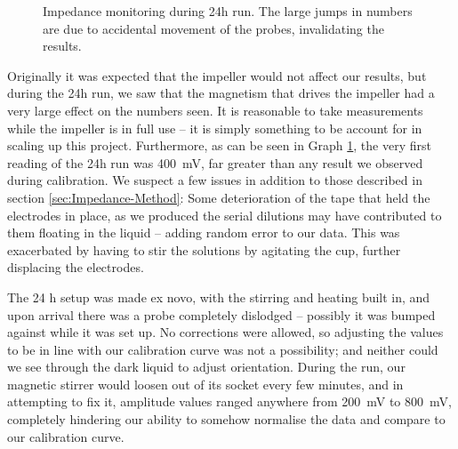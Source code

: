 \begin{figure}[] %
    \centering
    \caption{Impedance monitoring during 24h run. The large jumps in numbers are due to accidental movement of the probes, invalidating the results.}
    \label{gr:24hImpedance}
\end{figure}

Originally it was expected that the impeller would not affect our results, but during the 24h run, we saw that the magnetism that drives the impeller had a very large effect on the numbers seen.
It is reasonable to take measurements while the impeller is in full use -- it is simply something to be account for in scaling up this project. 
Furthermore, as can be seen in Graph \ref{gr:24hImpedance}, the very first reading of the 24h run was \SI{400}{\milli\volt}, far greater than any result we observed during calibration.
We suspect a few issues in addition to those described in section \ref{sec:Impedance-Method}: Some deterioration of the tape that held the electrodes in place, as we produced the serial dilutions may have contributed to them floating in the liquid -- adding random error to our data.
This was exacerbated by having to stir the solutions by agitating the cup, further displacing the electrodes.

The 24 h setup was made ex novo, with the stirring and heating built in, and upon arrival there was a probe completely dislodged -- possibly it was bumped against while it was set up. No corrections were allowed, so adjusting the values to be in line with our calibration curve was not a possibility; and neither could we see through the dark liquid to adjust orientation. During the run, our magnetic stirrer would loosen out of its socket every few minutes, and in attempting to fix it, amplitude values ranged anywhere from \SI{200}{\milli\volt} to \SI{800}{\milli\volt}, completely hindering our ability to somehow normalise the data and compare to our calibration curve.
